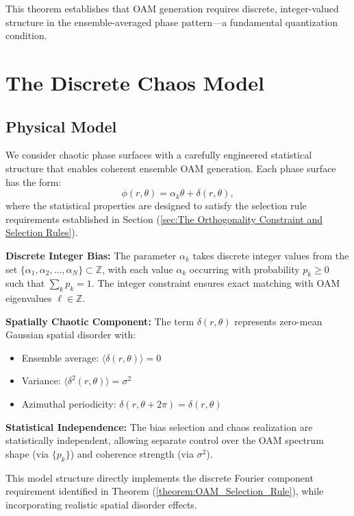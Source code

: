 \documentclass[a4paper,12pt]{article}
\newcommand{\ev}[1]{\langle #1 \rangle}
\begin{document}
This theorem establishes that OAM generation requires discrete, integer-valued structure in the ensemble-averaged phase 
pattern—a fundamental quantization condition.

\section{The Discrete Chaos Model}
\label{sec:The Discrete Chaos Model}

\subsection{Physical Model}

We consider chaotic phase surfaces with a carefully engineered statistical structure that enables coherent ensemble OAM 
generation. Each phase surface has the form:
\begin{equation}
    \phi(r,\theta) = \alpha_k \theta + \delta(r,\theta),
    \label{eq:discrete_model}
\end{equation}
where the statistical properties are designed to satisfy the selection rule requirements established in 
Section (\ref{sec:The Orthogonality Constraint and Selection Rules}).

\textbf{Discrete Integer Bias:} The parameter $\alpha_k$ takes discrete integer values from the set 
$\{\alpha_1, \alpha_2, \ldots, \alpha_N\} \subset \mathbb{Z}$, with each value $\alpha_k$ occurring with 
probability $p_k \geq 0$ such that $\sum_k p_k = 1$. The integer constraint ensures exact matching with OAM 
eigenvalues $\ell \in \mathbb{Z}$.

\textbf{Spatially Chaotic Component:} The term $\delta(r,\theta)$ represents zero-mean Gaussian spatial disorder with:
\begin{itemize}
    \item Ensemble average: $\ev{\delta(r,\theta)} = 0$
    \item Variance: $\ev{\delta^2(r,\theta)} = \sigma^2$ 
    \item Azimuthal periodicity: $\delta(r,\theta + 2\pi) = \delta(r,\theta)$
\end{itemize}

\textbf{Statistical Independence:} The bias selection and chaos realization are statistically independent, allowing 
separate control over the OAM spectrum shape (via $\{p_k\}$) and coherence strength (via $\sigma^2$).

This model structure directly implements the discrete Fourier component requirement identified in 
Theorem (\ref{theorem:OAM_Selection_Rule}), 
while incorporating realistic spatial disorder effects.
\end{document}

